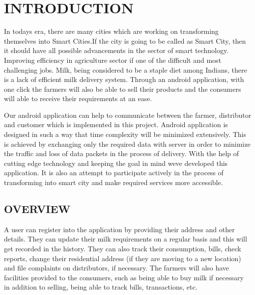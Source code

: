 
\chapter{\uppercase{Introduction}} %
\label{intro} %
In todays era, there are many cities which are working on transforming
themselves into Smart Cities.If the city is going to be called as Smart City,
then it should have all possible advancements in the sector of smart technology.
Improving efficiency in agriculture sector if one of the difficult and most challenging
jobs. Milk, being considered to be a staple diet among Indians, there is a lack of efficient milk delivery system. Through an android application, with one click the farmers will also be able to sell their products and the consumers will able to receive their requirements at an ease. 

Our android application can help to communicate between the farmer, distributor and customer which is implemented in this project. Android application is designed in such a way that time complexity will be minimized extensively. This is achieved by exchanging only the required data with server in order to minimize the traffic and loss of data packets in the process of delivery. With the help of cutting edge technology and keeping the goal in mind weve developed this application. It is also an attempt to
participate actively in the process of transforming into smart city and make
required services more accessible.


\section{\uppercase{Overview}}
A user can register into the application by providing their address and other details. They can update their milk requirements on a regular basis and this will get recorded in the history. They can also track their consumption, bills, check reports, change their
residential address (if they are moving to a new location) and file complaints on
distributors, if necessary.
The farmers  will also have facilities provided to the consumers, such as being able to buy milk if necessary in addition to selling, being able to track bills, transactions, etc.


